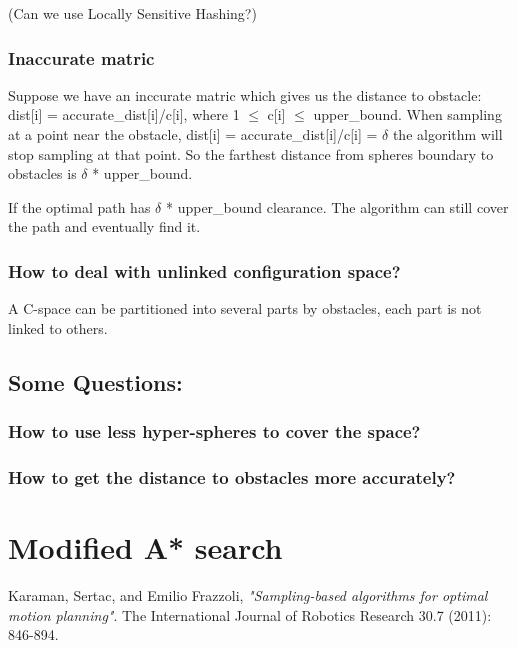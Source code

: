 \documentclass{article}
\begin{document}
 			(Can we use Locally Sensitive Hashing?)  

 		\subsubsection{Inaccurate matric}
			Suppose we have an inccurate matric which gives us the distance to obstacle:
 			dist[i] = accurate\_dist[i]/c[i], where 1 $\leq$ c[i] $\leq$ upper\_bound. When sampling at a point near the obstacle, dist[i] = accurate\_dist[i]/c[i] = $\delta$ the algorithm will stop sampling at that point. So the farthest distance from spheres boundary to obstacles is $\delta$ * upper\_bound. 

 			If the optimal path has $\delta$ * upper\_bound clearance. The algorithm can still cover the path and eventually find it.

    \subsubsection{How to deal with unlinked configuration space?}
      A C-space can be partitioned into several parts by obstacles, each part is not linked to others. 

	\subsection{Some Questions:}
 		\subsubsection{How to use less hyper-spheres to cover the space?}
 		\subsubsection{How to get the distance to obstacles more accurately?}

\section{Modified A* search}


\begin{thebibliography}{9}

  Karaman, Sertac, and Emilio Frazzoli,
  \emph{"Sampling-based algorithms for optimal motion planning"}.
  The International Journal of Robotics Research 30.7 (2011): 846-894.
\end{thebibliography}
\end{document}
